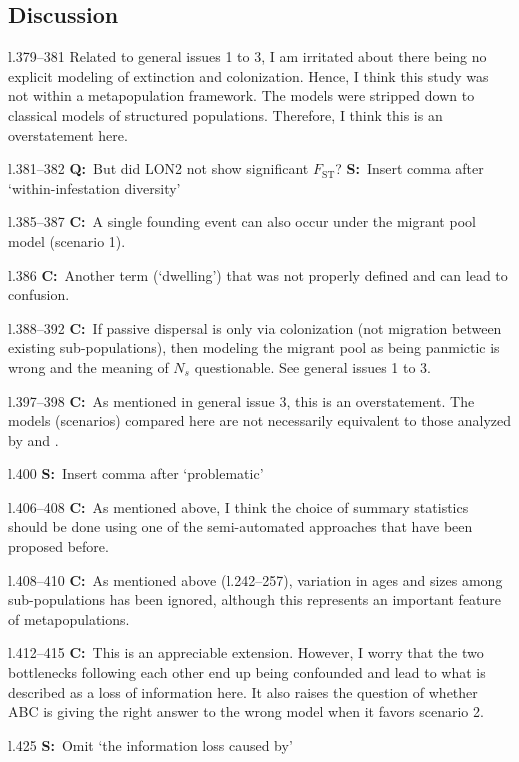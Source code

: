 \documentclass[11pt]{article}
\newenvironment{my_description}
{\begin{description}
  \setlength{\itemsep}{2pt}
  \setlength{\parskip}{0pt}
  \setlength{\parsep}{0pt}}
{\end{description}}
\newcommand{\C}{\textbf{C:}\ }
\newcommand{\Q}{\textbf{Q:}\ }
\newcommand{\V}{\textbf{S:}\ }
\begin{document}
\subsection{Discussion}
\begin{my_description}
	\item[l.379--381] Related to general issues 1 to 3, I am irritated about there being no explicit modeling of extinction and colonization. Hence, I think this study was not within a metapopulation framework. The models were stripped down to classical models of structured populations. Therefore, I think this is an overstatement here.
	\item[l.381--382] \Q But did LON2 not show significant $F_{\mathrm{ST}}$? \V Insert comma after `within-infestation diversity'
	\item[l.385--387] \C A single founding event can also occur under the migrant pool model (scenario 1).
	\item[l.386] \C Another term (`dwelling') that was not properly defined and can lead to confusion.
	\item[l.388--392] \C If passive dispersal is only via colonization (not migration between existing sub-populations), then modeling the migrant pool as being panmictic is wrong and the meaning of $N_s$ questionable. See general issues 1 to 3.
	\item[l.397--398] \C As mentioned in general issue 3, this is an overstatement. The models (scenarios) compared here are not necessarily equivalent to those analyzed by \citet{Wade:1988fk} and \cite{Pannell:1999uq}.
	\item[l.400] \V Insert comma after `problematic'
	\item[l.406--408] \C As mentioned above, I think the choice of summary statistics should be done using one of the semi-automated approaches that have been proposed before.
	\item[l.408--410] \C As mentioned above (l.242--257), variation in ages and sizes among sub-populations has been ignored, although this represents an important feature of metapopulations.
	\item[l.412--415] \C This is an appreciable extension. However, I worry that the two bottlenecks following each other end up being confounded and lead to what is described as a loss of information here. It also raises the question of whether ABC is giving the right answer to the wrong model when it favors scenario 2.
	\item[l.425] \V Omit `the information loss caused by'

\end{my_description}
\end{document}
